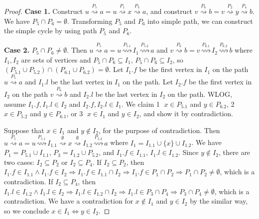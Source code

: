 \begin{proof}
    \textbf{Case 1.}
    Construct
    $u \overset{P_5}{\rightsquigarrow} a
    = u \overset{P_1}{\rightsquigarrow} x \overset{P_3}{\rightsquigarrow} a$,
    and construct
    $v \overset{P_6}{\rightsquigarrow} b
    = v \overset{P_2}{\rightsquigarrow} y \overset{P_4}{\rightsquigarrow} b$.
    We have $P_5 \cap P_6 = \emptyset$.
    Transforming $P_5$ and $P_6$ into simple path,
    we can construct the simple cycle by using path $P_5$ and $P_6$.

    \textbf{Case 2.}
    $P_5 \cap P_6 \neq \emptyset$.
    Then $u \overset{P_5}{\rightsquigarrow} a
    = u \overset{P_{5.1}}{\rightsquigarrow} I_1 \overset{P_{5.2}}{\rightsquigarrow} a$
    and $v \overset{P_6}{\rightsquigarrow} b
    = v \overset{P_{6.1}}{\rightsquigarrow} I_2 \overset{P_{6.2}}{\rightsquigarrow} b$
    where $I_1,I_2$ are sets of vertices 
    and $P_5 \cap P_6 \subseteq I_1$, $P_5 \cap P_6 \subseteq I_2$,
    so $(P_{5.1} \cup P_{5.2}) \cap (P_{6.1} \cup P_{6.2}) = \emptyset$.
    Let $I_1.f$ be the first vertex in $I_1$ on the path $u \overset{P_5}{\rightsquigarrow} a$
    and $I_1.l$ be the last vertex in $I_1$ on the path.
    Let $I_2.f$ be the first vertex in $I_2$ on the path $v \overset{P_6}{\rightsquigarrow} b$
    and $I_2.l$ be the last vertex in $I_2$ on the path.
    WLOG, assume $I_1.f, I_1.l \in I_2$ and $I_2.f, I_2.l \in I_1$.
    We claim \textcircled{1} $x \in P_{5.1}$ and $y \in P_{6.2}$,
    \textcircled{2} $x \in P_{5.2}$ and $y \in P_{6.1}$,
    or \textcircled{3} $x \in I_1$ and $y \in I_2$, and
    show it by contradiction.
    
    Suppose that $x \in I_1$ and $y \notin I_2$, for the purpose of contradiction.
    Then $u \overset{P_5}{\rightsquigarrow} a = u \overset{P_{5.1}}{\rightsquigarrow} I_{1.1} 
    \overset{\emptyset}{\rightsquigarrow} x \overset{\emptyset}{\rightsquigarrow}
    I_{1.2} \overset{P_{5.2}}{\rightsquigarrow} a$ where $I_1 = I_{1.1} \cup \{ x \} \cup I_{1.2}$.
    We have $P_1 = P_{5.1} \cup I_{1.1}$, $P_3 = I_{1.2} \cup P_{5.2}$, 
    and $I_1.f \in I_{1.1}$, $I_1.l \in I_{1.2}$.
    Since $y \notin I_2$, there are two cases: $I_2 \subseteq P_2$ or $I_2 \subseteq P_4$.
    If $I_2 \subseteq P_2$, then 
    $I_1.f \in I_{1.1} \wedge I_1.f \in I_2 \Longrightarrow I_1.f \in I_{1.1} \cap I_2
    \Longrightarrow I_1.f \in P_1 \cap P_2
    \Longrightarrow P_1 \cap P_2 \neq \emptyset$,
    which is a contradiction.
    If $I_2 \subseteq P_4$, then 
    $I_1.l \in I_{1.2} \wedge I_1.l \in I_2 \Longrightarrow I_1.l \in I_{1.2} \cap I_2
    \Longrightarrow I_1.l \in P_3 \cap P_4
    \Longrightarrow P_3 \cap P_4 \neq \emptyset$,
    which is a contradiction.
    We have a contradiction for $x \notin I_1$ and $y \in I_2$ by the similar way,
    so we conclude $x \in I_1 \Longleftrightarrow y \in I_2$.


\end{proof}
